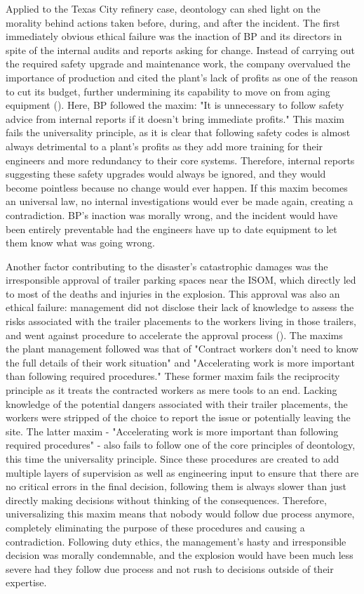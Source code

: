 \documentclass[12pt]{article}
\begin{document}
	Applied to the Texas City refinery case, deontology can shed light on the morality behind actions taken before, during, and after the incident. The first immediately obvious ethical failure was the inaction of BP and its directors in spite of the internal audits and reports asking for change. Instead of carrying out the required safety upgrade and maintenance work, the company overvalued the importance of production and cited the plant's lack of profits as one of the reason to cut its budget, further undermining its capability to move on from aging equipment (\cite{csbreport}). Here, BP followed the maxim: "It is unnecessary to follow safety advice from internal reports if it doesn't bring immediate profits." This maxim fails the universality principle, as it is clear that following safety codes is almost always detrimental to a plant's profits as they add more training for their engineers and more redundancy to their core systems. Therefore, internal reports suggesting these safety upgrades would always be ignored, and they would become pointless because no change would ever happen. If this maxim becomes an universal law, no internal investigations would ever be made again, creating a contradiction. BP's inaction was morally wrong, and the incident would have been entirely preventable had the engineers have up to date equipment to let them know what was going wrong.
	
	Another factor contributing to the disaster's catastrophic damages was the irresponsible approval of trailer parking spaces near the ISOM, which directly led to most of the deaths and injuries in the explosion. This approval was also an ethical failure: management did not disclose their lack of knowledge to assess the risks associated with the trailer placements to the workers living in those trailers, and went against procedure to accelerate the approval process (\cite{csbreport}). The maxims the plant management followed was that of "Contract workers don't need to know the full details of their work situation" and "Accelerating work is more important than following required procedures." These former maxim fails the reciprocity principle as it treats the contracted workers as mere tools to an end. Lacking knowledge of the potential dangers associated with their trailer placements, the workers were stripped of the choice to report the issue or potentially leaving the site. The latter maxim - "Accelerating work is more important than following required procedures"  -  also fails to follow one of the core principles of deontology, this time the universality principle. Since these procedures are created to add multiple layers of supervision as well as engineering input to ensure that there are no critical errors in the final decision, following them is always slower than just directly making decisions without thinking of the consequences. Therefore, universalizing this maxim means that nobody would follow due process anymore, completely eliminating the purpose of these procedures and causing a contradiction. Following duty ethics, the management's hasty and irresponsible decision was morally condemnable, and the explosion would have been much less severe had they follow due process and not rush to decisions outside of their expertise.
	
\end{document}
